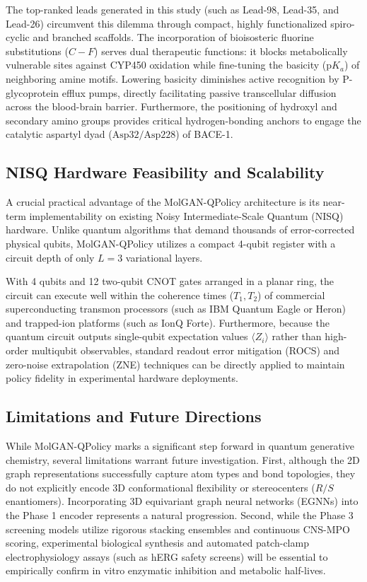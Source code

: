 \documentclass[10pt,a4paper]{article}
\begin{document}
The top-ranked leads generated in this study (such as Lead-98, Lead-35, and Lead-26) circumvent this dilemma through compact, highly functionalized spiro-cyclic and branched scaffolds. The incorporation of bioisosteric fluorine substitutions ($C-F$) serves dual therapeutic functions: it blocks metabolically vulnerable sites against CYP450 oxidation while fine-tuning the basicity ($\text{p}K_a$) of neighboring amine motifs. Lowering basicity diminishes active recognition by P-glycoprotein efflux pumps, directly facilitating passive transcellular diffusion across the blood-brain barrier. Furthermore, the positioning of hydroxyl and secondary amino groups provides critical hydrogen-bonding anchors to engage the catalytic aspartyl dyad ($\text{Asp}32/\text{Asp}228$) of BACE-1.

\subsection{NISQ Hardware Feasibility and Scalability}
A crucial practical advantage of the MolGAN-QPolicy architecture is its near-term implementability on existing Noisy Intermediate-Scale Quantum (NISQ) hardware. Unlike quantum algorithms that demand thousands of error-corrected physical qubits, MolGAN-QPolicy utilizes a compact 4-qubit register with a circuit depth of only $L=3$ variational layers. 

With 4 qubits and 12 two-qubit CNOT gates arranged in a planar ring, the circuit can execute well within the coherence times ($T_1, T_2$) of commercial superconducting transmon processors (such as IBM Quantum Eagle or Heron) and trapped-ion platforms (such as IonQ Forte). Furthermore, because the quantum circuit outputs single-qubit expectation values $\langle Z_i \rangle$ rather than high-order multiqubit observables, standard readout error mitigation (ROCS) and zero-noise extrapolation (ZNE) techniques can be directly applied to maintain policy fidelity in experimental hardware deployments.

\subsection{Limitations and Future Directions}
While MolGAN-QPolicy marks a significant step forward in quantum generative chemistry, several limitations warrant future investigation. First, although the 2D graph representations successfully capture atom types and bond topologies, they do not explicitly encode 3D conformational flexibility or stereocenters ($R/S$ enantiomers). Incorporating 3D equivariant graph neural networks (EGNNs) into the Phase 1 encoder represents a natural progression. Second, while the Phase 3 screening models utilize rigorous stacking ensembles and continuous CNS-MPO scoring, experimental biological synthesis and automated patch-clamp electrophysiology assays (such as hERG safety screens) will be essential to empirically confirm in vitro enzymatic inhibition and metabolic half-lives.
\end{document}
